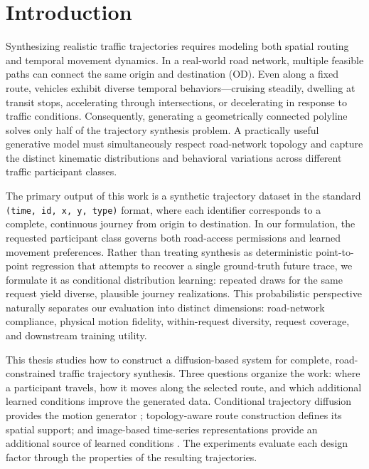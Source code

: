 \chapter{Introduction}
\label{ch:native-introduction}

Synthesizing realistic traffic trajectories requires modeling both spatial routing and temporal movement dynamics. In a real-world road network, multiple feasible paths can connect the same origin and destination (OD). Even along a fixed route, vehicles exhibit diverse temporal behaviors—cruising steadily, dwelling at transit stops, accelerating through intersections, or decelerating in response to traffic conditions. Consequently, generating a geometrically connected polyline solves only half of the trajectory synthesis problem. A practically useful generative model must simultaneously respect road-network topology and capture the distinct kinematic distributions and behavioral variations across different traffic participant classes.

The primary output of this work is a synthetic trajectory dataset in the standard \texttt{(time, id, x, y, type)} format, where each identifier corresponds to a complete, continuous journey from origin to destination. In our formulation, the requested participant class governs both road-access permissions and learned movement preferences. Rather than treating synthesis as deterministic point-to-point regression that attempts to recover a single ground-truth future trace, we formulate it as conditional distribution learning: repeated draws for the same request yield diverse, plausible journey realizations. This probabilistic perspective naturally separates our evaluation into distinct dimensions: road-network compliance, physical motion fidelity, within-request diversity, request coverage, and downstream training utility.

This thesis studies how to construct a diffusion-based system for complete, road-constrained traffic trajectory synthesis. Three questions organize the work: where a participant travels, how it moves along the selected route, and which additional learned conditions improve the generated data. Conditional trajectory diffusion provides the motion generator \cite{ddpm,difftraj,diffrn}; topology-aware route construction defines its spatial support; and image-based time-series representations provide an additional source of learned conditions \cite{salvadori,ferreira}. The experiments evaluate each design factor through the properties of the resulting trajectories.


